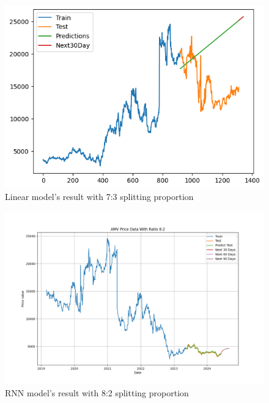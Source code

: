 \documentclass{ieeeojies}
\begin{document}
\vspace{-1em}

\begin{figure}[H]
  \centering
  \begin{minipage}{0.8\linewidth}
    \centering
    \includegraphics[width=\linewidth]{bibliography/Figure/LN_AMV(7_3).png}
    \caption{Linear model's result with 7:3 splitting proportion}
    \label{fig8}
  \end{minipage}
\end{figure}

\vspace{-1em}

\begin{figure}[H]
  \centering
  \begin{minipage}{0.8\linewidth}
    \centering
    \includegraphics[width=\linewidth]{bibliography/Figure/RNN_82_AMV.png}
    \caption{RNN model's result with 8:2 splitting proportion}
    \label{fig8}
  \end{minipage}
\end{figure}
\end{document}

